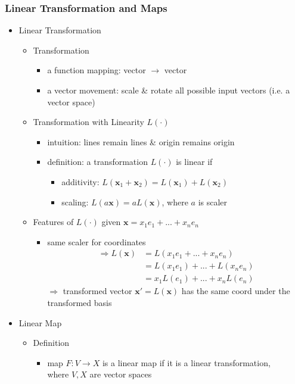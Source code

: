 \subsubsection{Linear Transformation and Maps}
\begin{itemize}
\item Linear Transformation
	\begin{itemize}
	\item Transformation
		\begin{itemize}
		\item a function mapping: vector $\rightarrow$ vector
		\item a vector movement: scale \& rotate all possible input vectors (i.e. a vector space)
		\end{itemize}
	\item Transformation with Linearity $L(\cdot)$
		\begin{itemize}
		\item intuition: lines remain lines \& origin remains origin
		\item definition: a transformation $L(\cdot)$ is linear if
			\begin{itemize}
			\item additivity: $L(\mathbf x_1 + \mathbf x_2) = L(\mathbf x_1) + L(\mathbf x_2)$
			\item scaling: $L(a\mathbf x) = aL(\mathbf x)$, where $a$ is scaler
			\end{itemize}
		\end{itemize}
	\item Features of $L(\cdot)$ given $\mathbf x = x_1e_1 +...+ x_ne_n$
		\begin{itemize}
		\item same scaler for coordinates
		\begin{align*} \Rightarrow L(\mathbf x) &= L(x_1e_1 +...+x_ne_n) \\ &= L(x_1e_1)+...+L(x_ne_n) \\ &= x_1L(e_1)+...+x_nL(e_n) \end{align*}
		$\Rightarrow$ transformed vector $\mathbf x'=L(\mathbf x)$ has the same coord under the transformed basis
		\end{itemize}
	\end{itemize}

\item Linear Map
	\begin{itemize}
	\item Definition
		\begin{itemize}
		\item map $F:V\rightarrow X$ is a linear map if it is a linear transformation, \\
		where $V,X$ are vector spaces
		\end{itemize}
	\end{itemize}


\end{itemize}
